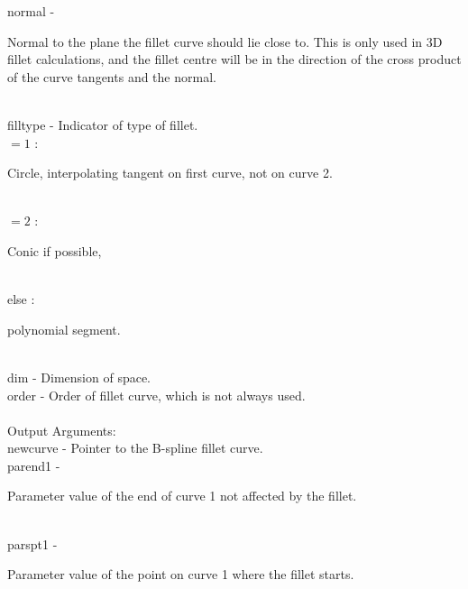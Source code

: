         \>\>    {\fov normal}   \> - \> \begin{minipg2}
                        Normal to the plane the fillet curve
                        should lie close to. This is only used in 3D
                        fillet calculations, and the fillet centre will
                        be in the direction of the cross product of the
                        curve tangents and the normal.
                                \end{minipg2}\\[0.3ex]
        \>\>    {\fov filltype}\> - \>  Indicator of type of fillet.\\
                \>\>\>\>\>      $=1$ : \>\begin{minipg5}
                                Circle, interpolating tangent on first
                                curve, not on curve 2.
                                \end{minipg5}\\[0.3ex]
                \>\>\>\>\>      $=2$ : \>\begin{minipg5}
                                Conic if possible,
                                \end{minipg5}\\
                \>\>\>\>\>      else : \>\begin{minipg5}
                                polynomial segment.
                                \end{minipg5}\\
        \>\>    {\fov dim}      \> - \> Dimension of space.\\
        \>\>    {\fov order}    \> - \> Order of fillet curve, which is not always used.\\
\\
        \>Output Arguments:\\
        \>\>    {\fov newcurve}\> - \> Pointer to the B-spline fillet curve.\\
        \>\>    {\fov parend1}  \> - \> \begin{minipg2}
                        Parameter value of the end of curve 1 not affected
                        by the fillet.
                                \end{minipg2}\\[0.8ex]
        \>\>    {\fov parspt1}  \> - \> \begin{minipg2}
                        Parameter value of the point on curve 1 where the
                        fillet starts.
                                \end{minipg2}\\[0.8ex]
